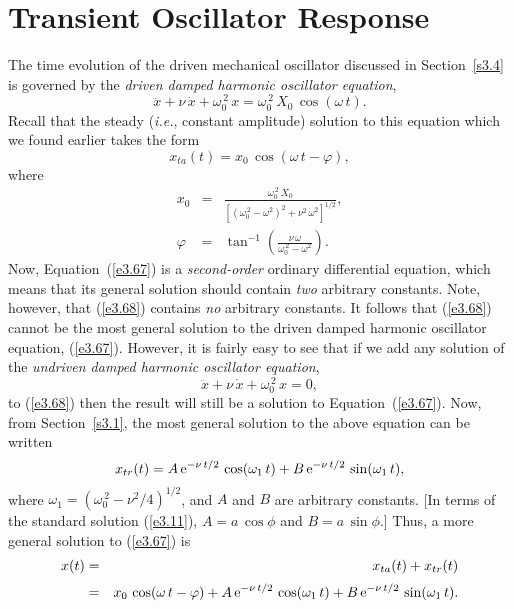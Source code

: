 \section{Transient Oscillator Response}
The time evolution of the  driven mechanical oscillator discussed in Section~\ref{s3.4} is governed by the 
{\em driven damped harmonic oscillator equation},
\begin{equation}\label{e3.67}
\ddot{x} + \nu\,\dot{x} + \omega_0^{\,2}\,x = \omega_0^{\,2}\,X_0\,\cos(\omega\,t).
\end{equation}
Recall that the steady ({\em i.e.}, constant amplitude) solution to this equation which we found earlier takes the form
\begin{equation}\label{e3.68}
x_{ta}(t)=x_0\,\cos(\omega\,t-\varphi),
\end{equation}
where
\begin{eqnarray}
x_0&=& \frac{\omega_0^{\,2}\,X_0}{\left[(\omega_0^{\,2}-\omega^2)^2+\nu^2\,\omega^2\right]^{1/2}},\\[0.5ex]
\varphi &=&\tan^{-1}\left(\frac{\nu\,\omega}{\omega_0^{\,2}-\omega^2}\right).
\end{eqnarray}
Now, Equation~(\ref{e3.67}) is a {\em second-order}\/ ordinary differential equation, which means that its general solution should contain {\em two}\/ arbitrary constants. 
Note, however, that (\ref{e3.68}) contains {\em no}\/ arbitrary constants. It follows that (\ref{e3.68}) cannot be the most general solution to the driven damped harmonic oscillator equation, (\ref{e3.67}). However, it is fairly easy to see that if
we add any solution of the {\em undriven damped harmonic oscillator equation}, 
\begin{equation}
\ddot{x} + \nu\,\dot{x} + \omega_0^{\,2}\,x = 0,
\end{equation}
to (\ref{e3.68}) then the result will still be a solution to Equation~(\ref{e3.67}).
Now, from Section~\ref{s3.1}, the most general solution to the
above equation can be written
\begin{equation}\label{e3.72}
x_{tr}(t) = A\,{\rm e}^{-\nu\,t/2}\,\cos(\omega_1\,t) + B\,{\rm e}^{-\nu\,t/2}\,\sin(\omega_1\,t),
\end{equation}
where $\omega_1=(\omega_0^{\,2}-\nu^2/4)^{1/2}$,  and $A$ and $B$ are arbitrary constants. [In terms of the standard solution (\ref{e3.11}), $A=a\,\cos\phi$ and $B=a\,\sin\phi$.]
Thus, a more general solution to (\ref{e3.67}) is
\begin{eqnarray}\label{e3.73}
x(t) &=& x_{ta}(t) + x_{tr}(t)\nonumber\\[0.5ex] 
&=& x_0\,\cos(\omega\,t-\varphi) +  A\,{\rm e}^{-\nu\,t/2}\,\cos(\omega_1\,t) + B\,{\rm e}^{-\nu\,t/2}\,\sin(\omega_1\,t).
\end{eqnarray}
